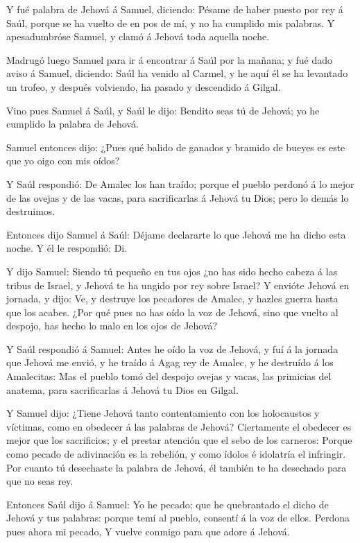  Y fué palabra de Jehová á Samuel, diciendo: 
Pésame de haber puesto por rey á Saúl, porque se ha vuelto de en pos de
mí, y no ha cumplido mis palabras. Y apesadumbróse Samuel, y clamó á
Jehová toda aquella noche.

 Madrugó luego Samuel para ir á encontrar á Saúl por la
mañana; y fué dado aviso á Samuel, diciendo: Saúl ha venido al Carmel, y
he aquí él se ha levantado un trofeo, y después volviendo, ha pasado y
descendido á Gilgal.

 Vino pues Samuel á Saúl, y Saúl le dijo: Bendito seas tú
de Jehová; yo he cumplido la palabra de Jehová.

 Samuel entonces dijo: ¿Pues qué balido de ganados y
bramido de bueyes es este que yo oigo con mis oídos?

 Y Saúl respondió: De Amalec los han traído; porque el
pueblo perdonó á lo mejor de las ovejas y de las vacas, para
sacrificarlas á Jehová tu Dios; pero lo demás lo destruimos.

 Entonces dijo Samuel á Saúl: Déjame declararte lo que
Jehová me ha dicho esta noche. Y él le respondió: Di.

 Y dijo Samuel: Siendo tú pequeño en tus ojos ¿no has sido
hecho cabeza á las tribus de Israel, y Jehová te ha ungido por rey sobre
Israel?  Y envióte Jehová en jornada, y dijo: Ve, y
destruye los pecadores de Amalec, y hazles guerra hasta que los acabes.
 ¿Por qué pues no has oído la voz de Jehová, sino que
vuelto al despojo, has hecho lo malo en los ojos de Jehová?

 Y Saúl respondió á Samuel: Antes he oído la voz de Jehová,
y fuí á la jornada que Jehová me envió, y he traído á Agag rey de
Amalec, y he destruído á los Amalecitas:  Mas el pueblo
tomó del despojo ovejas y vacas, las primicias del anatema, para
sacrificarlas á Jehová tu Dios en Gilgal.

 Y Samuel dijo: ¿Tiene Jehová tanto contentamiento con los
holocaustos y víctimas, como en obedecer á las palabras de Jehová?
Ciertamente el obedecer es mejor que los sacrificios; y el prestar
atención que el sebo de los carneros:  Porque como pecado
de adivinación es la rebelión, y como ídolos é idolatría el infringir.
Por cuanto tú desechaste la palabra de Jehová, él también te ha
desechado para que no seas rey.

 Entonces Saúl dijo á Samuel: Yo he pecado; que he
quebrantado el dicho de Jehová y tus palabras: porque temí al pueblo,
consentí á la voz de ellos. Perdona pues ahora mi pecado, 
Y vuelve conmigo para que adore á Jehová.

